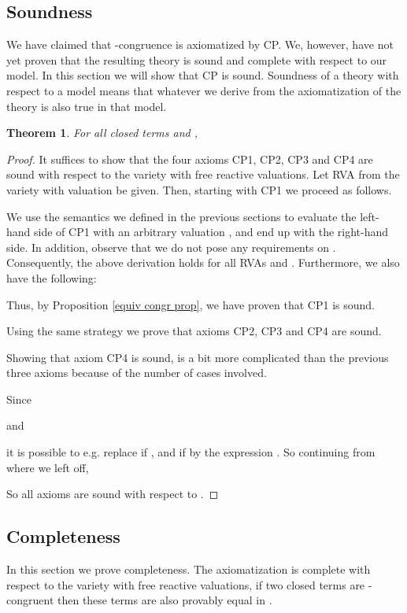 \documentclass[a4paper,twoside,openright]{report}
\newtheorem{thm}[theorem]{Theorem}
\begin{document}
\subsection{Soundness}
We have claimed that -congruence is axiomatized by CP. We, however, have not yet proven that the resulting theory is sound and complete with respect to our model. In this section we will show that CP is sound. Soundness of a theory with respect to a model means that whatever we derive from the axiomatization of the theory is also true in that model.
\begin{thm}\label{soundness cp}
For all closed terms  and , 

\end{thm}
\begin{proof}
It suffices to show that the four axioms CP1, CP2, CP3 and CP4 are sound with respect to the variety with free reactive valuations. Let RVA  from the variety  with valuation  be given. Then, starting with CP1 we proceed as follows.

We use the semantics we defined in the previous sections to evaluate the left-hand side of CP1 with an arbitrary valuation , and end up with the right-hand side. In addition, observe that we do not pose any requirements on . Consequently, the above derivation holds for all RVAs  and . 
Furthermore, we also have the following:

Thus, by Proposition \ref{equiv congr prop}, we have proven that CP1 is sound.

Using the same strategy we prove that axioms CP2, CP3 and CP4 are sound.





Showing that axiom CP4 is sound, is a bit more complicated than the previous three axioms because of the number of cases involved.

Since

and

it is possible to e.g. replace  if ,
and  if  by the expression . So continuing from where we left off,



So all axioms are sound with respect to .
\end{proof}

\subsection{Completeness}
In this section we prove completeness. The axiomatization  is complete with respect to the variety with free reactive valuations, if two closed terms are -congruent then these terms are also provably equal in .
\end{document}
